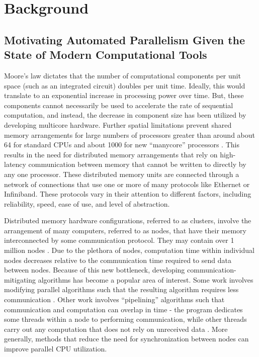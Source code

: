 \chapter{Background}

\section{Motivating Automated Parallelism Given the State of Modern
Computational Tools}
Moore's law dictates that the number of computational components per unit space
(such as an integrated circuit) doubles per unit time. Ideally, this would
translate to an exponential increase in processing power over time. But, these
components cannot necessarily be used to accelerate the rate of sequential
computation, and instead, the decrease in component size has been utilized by
developing multicore hardware. Further spatial limitations prevent shared memory
arrangements for large numbers of processors greater than around about 64 for
standard CPUs and about 1000 for new ``manycore'' processors \cite{manycore}. This
results in the need for distributed memory arrangements that rely on
high-latency communication between memory that cannot be written to directly by
any one processor. These distributed memory units are connected through a
network of connections that use one or more of many protocols like Ethernet or
Infiniband. These protocols vary in their attention to different factors,
including reliability, speed, ease of use, and level of abstraction.

Distributed memory hardware configurations, referred to as clusters, involve the
arrangement of many computers, referred to as nodes, that have their memory
interconnected by some communication protocol. They may contain over 1 million
nodes \cite{top500}. Due to the plethora of nodes, computation time within
individual nodes decreases relative to the communication time required to send
data between nodes. Because of this new bottleneck, developing
communication-mitigating algorithms has become a popular area of interest. Some
work involves modifying parallel algorithms such that the resulting algorithm
requires less communication \cite{strassen_comm_opt}. Other work involves
``pipelining'' algorithms such that communication and computation can overlap in
time \-- the program dedicates some threads within a node to performing
communication, while other threads carry out any computation that does not rely
on unreceived data \cite{gmres_pipe}.  More generally, methods that reduce the
need for synchronization between nodes can improve parallel CPU utilization.

